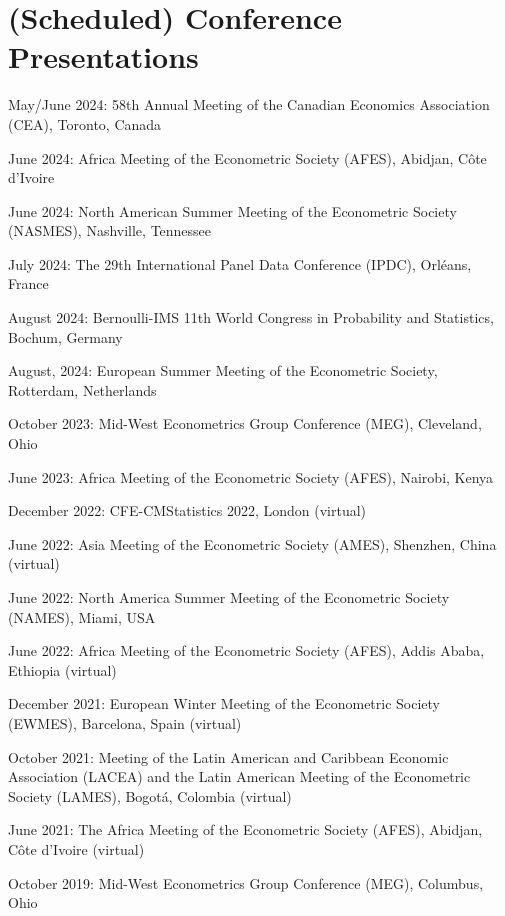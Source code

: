 \documentclass[12pt,letterpaper]{article}
\renewenvironment{itemize}{
  \begin{list}{}{
    \setlength{\leftmargin}{1.5em}
  }
}{
  \end{list}
}
\begin{document}
\section*{(Scheduled) Conference Presentations}
\begin{itemize}
  \item May/June 2024: 58th Annual Meeting of the Canadian Economics Association (CEA), Toronto, Canada

  \item June 2024: Africa Meeting of the Econometric Society (AFES), Abidjan, Côte d'Ivoire

  \item June 2024: North American Summer Meeting of the Econometric Society (NASMES), Nashville, Tennessee

  \item July 2024: The 29th International Panel Data Conference (IPDC), Orléans, France

  \item August 2024: Bernoulli-IMS 11th World Congress in Probability and Statistics, Bochum, Germany

  \item August, 2024: European Summer Meeting of the Econometric Society, Rotterdam, Netherlands

  \item October 2023: Mid-West Econometrics Group Conference (MEG), Cleveland, Ohio
  \item June 2023: Africa Meeting of the Econometric Society (AFES), Nairobi, Kenya
  \item December 2022: CFE-CMStatistics 2022, London (virtual)
  \item June 2022: Asia Meeting of the Econometric Society (AMES), Shenzhen, China (virtual)
  \item June 2022: North America Summer Meeting of the Econometric Society (NAMES), Miami, USA
  \item June 2022: Africa Meeting of the Econometric Society (AFES), Addis Ababa, Ethiopia (virtual)
  \item December 2021: European Winter Meeting of the Econometric Society (EWMES), Barcelona, Spain (virtual)
  \item October 2021: Meeting of the Latin American and Caribbean Economic Association (LACEA) and the Latin American Meeting of the Econometric Society (LAMES), Bogotá, Colombia (virtual)
	\item June 2021: The Africa Meeting of the Econometric Society (AFES), Abidjan, C\^ote d'Ivoire (virtual)
	\item October 2019: Mid-West Econometrics Group Conference (MEG), Columbus, Ohio
\end{itemize}
\end{document}
